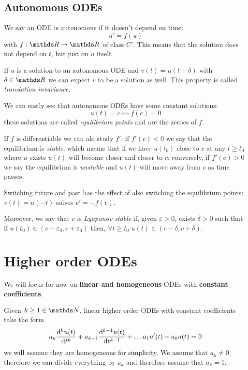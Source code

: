 \documentclass[12pt]{extarticle}
\begin{document}
\subsection{Autonomous ODEs}

We say an ODE is autonomous if it doesn't depend on time:
\begin{equation}
	u' = f(u)
\end{equation}
with $f: \R \to \R$ of class $C'$.
This means that the solution does not depend on $t$, but just on $u$ itself.

If $u$ is a solution to an autonomous ODE and $v(t) = u(t + \delta)$ with $\delta \in \R$ we can expect $v$ to be a solution as well.
This property is called \emph{translation invariance}.

We can easily see that autonomous ODEs have some constant solutions:
\begin{equation}
	u(t) = c \iff f(c) = 0
\end{equation}
these solutions are called \emph{equilibrium points} and are the zeroes of $f$.

If $f$ is differentiable we can alo study $f'$: if $f'(c) < 0$ we say that the equilibrium is \emph{stable}, which means that if we have $u(t_0)$ close to $c$ at any $t \geq t_0$ where $u$ exists $u(t)$ will become closer and closer to $c$; conversely, if $f'(c) > 0$ we say the equilibrium is \emph{unstable} and $u(t)$ will move away from $c$ as time passes.

Switching future and past has the effect of also switching the equilibrium points: $v(t) = u(-t)$ solves $v' = -f(v)$.

Moreover, we say that $c$ is \emph{Lyapunov stable} if, given $\varepsilon > 0$, exists $\delta >0$ such that if $u(t_0) \in (c - \varepsilon_0, c + \varepsilon_0)$ then, $\forall t \geq t_0$ $u(t) \in (c-\delta, c+\delta)$.

\section{Higher order ODEs}

We will focus for now on \textbf{linear and homogeneous} ODEs with \textbf{constant coefficients}.

Given $k \geq 1 \in \N$, linear higher order ODEs with constant coefficients take the form
\begin{equation}
	\label{eq:higher-order-linear-const-coeff-ode}
	a_k \dv[k]{u(t)}{t} + a_{k-1}\dv[k-1]{u(t)}{t} + \dots a_1 u'(t) + a_0 u(t) = 0
\end{equation}
we will assume they are homogeneous for simplicity.
We assume that $a_k \neq 0$, therefore we can divide everything by $a_k$ and therefore assume that $a_k = 1$.
\end{document}
